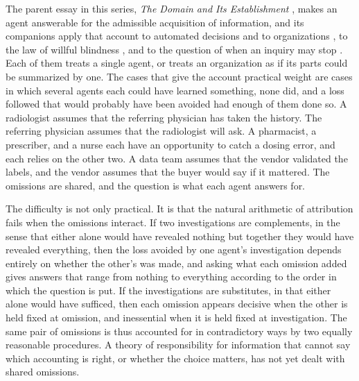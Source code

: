 \documentclass[11pt]{article}
\theoremstyle{plain}
\theoremstyle{definition}
\begin{document}
The parent essay in this series, \emph{The Domain and Its Establishment} \cite{flyxion2026domain}, makes an agent answerable for the admissible acquisition of information, and its companions apply that account to automated decisions and to organizations \cite{flyxion2026inputs}, to the law of willful blindness \cite{flyxion2026law}, and to the question of when an inquiry may stop \cite{flyxion2026stop}. Each of them treats a single agent, or treats an organization as if its parts could be summarized by one. The cases that give the account practical weight are cases in which several agents each could have learned something, none did, and a loss followed that would probably have been avoided had enough of them done so. A radiologist assumes that the referring physician has taken the history. The referring physician assumes that the radiologist will ask. A pharmacist, a prescriber, and a nurse each have an opportunity to catch a dosing error, and each relies on the other two. A data team assumes that the vendor validated the labels, and the vendor assumes that the buyer would say if it mattered. The omissions are shared, and the question is what each agent answers for.

The difficulty is not only practical. It is that the natural arithmetic of attribution fails when the omissions interact. If two investigations are complements, in the sense that either alone would have revealed nothing but together they would have revealed everything, then the loss avoided by one agent's investigation depends entirely on whether the other's was made, and asking what each omission added gives answers that range from nothing to everything according to the order in which the question is put. If the investigations are substitutes, in that either alone would have sufficed, then each omission appears decisive when the other is held fixed at omission, and inessential when it is held fixed at investigation. The same pair of omissions is thus accounted for in contradictory ways by two equally reasonable procedures. A theory of responsibility for information that cannot say which accounting is right, or whether the choice matters, has not yet dealt with shared omissions.
\end{document}
